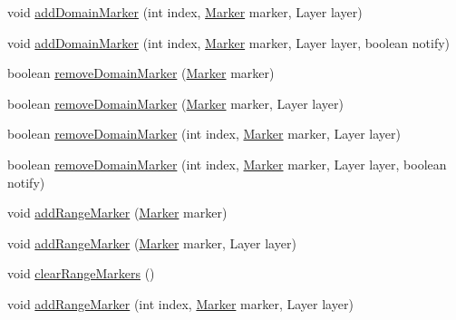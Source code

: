 \begin{DoxyCompactItemize}
void \mbox{\hyperlink{classorg_1_1jfree_1_1chart_1_1plot_1_1_x_y_plot_a1ce4aad5fc259b7fac498fa117ab9f6e}{add\+Domain\+Marker}} (int index, \mbox{\hyperlink{classorg_1_1jfree_1_1chart_1_1plot_1_1_marker}{Marker}} marker, Layer layer)
\item 
void \mbox{\hyperlink{classorg_1_1jfree_1_1chart_1_1plot_1_1_x_y_plot_a036e086446ec74de1577c1fc471c7062}{add\+Domain\+Marker}} (int index, \mbox{\hyperlink{classorg_1_1jfree_1_1chart_1_1plot_1_1_marker}{Marker}} marker, Layer layer, boolean notify)
\item 
boolean \mbox{\hyperlink{classorg_1_1jfree_1_1chart_1_1plot_1_1_x_y_plot_a7ed71c17fd5ae2ff77c3e38e52c0b634}{remove\+Domain\+Marker}} (\mbox{\hyperlink{classorg_1_1jfree_1_1chart_1_1plot_1_1_marker}{Marker}} marker)
\item 
boolean \mbox{\hyperlink{classorg_1_1jfree_1_1chart_1_1plot_1_1_x_y_plot_ac5e3c85422eb44952b1fd7c365e23175}{remove\+Domain\+Marker}} (\mbox{\hyperlink{classorg_1_1jfree_1_1chart_1_1plot_1_1_marker}{Marker}} marker, Layer layer)
\item 
boolean \mbox{\hyperlink{classorg_1_1jfree_1_1chart_1_1plot_1_1_x_y_plot_ae43a099e06fde57a74dd5f5916d3ccda}{remove\+Domain\+Marker}} (int index, \mbox{\hyperlink{classorg_1_1jfree_1_1chart_1_1plot_1_1_marker}{Marker}} marker, Layer layer)
\item 
boolean \mbox{\hyperlink{classorg_1_1jfree_1_1chart_1_1plot_1_1_x_y_plot_a6ba2ad96dd241ab73ca8214d0713b3cc}{remove\+Domain\+Marker}} (int index, \mbox{\hyperlink{classorg_1_1jfree_1_1chart_1_1plot_1_1_marker}{Marker}} marker, Layer layer, boolean notify)
\item 
void \mbox{\hyperlink{classorg_1_1jfree_1_1chart_1_1plot_1_1_x_y_plot_a1597e208db44ce298c12254a360e92f6}{add\+Range\+Marker}} (\mbox{\hyperlink{classorg_1_1jfree_1_1chart_1_1plot_1_1_marker}{Marker}} marker)
\item 
void \mbox{\hyperlink{classorg_1_1jfree_1_1chart_1_1plot_1_1_x_y_plot_a4cc8c235ec5d42bbd18328ef732cbd56}{add\+Range\+Marker}} (\mbox{\hyperlink{classorg_1_1jfree_1_1chart_1_1plot_1_1_marker}{Marker}} marker, Layer layer)
\item 
void \mbox{\hyperlink{classorg_1_1jfree_1_1chart_1_1plot_1_1_x_y_plot_a285a7793a2beb946d4beae4b02187f3c}{clear\+Range\+Markers}} ()
\item 
void \mbox{\hyperlink{classorg_1_1jfree_1_1chart_1_1plot_1_1_x_y_plot_a2bf8119a33276c7e4cb87a8d9e2ceedb}{add\+Range\+Marker}} (int index, \mbox{\hyperlink{classorg_1_1jfree_1_1chart_1_1plot_1_1_marker}{Marker}} marker, Layer layer)

\end{DoxyCompactItemize}
